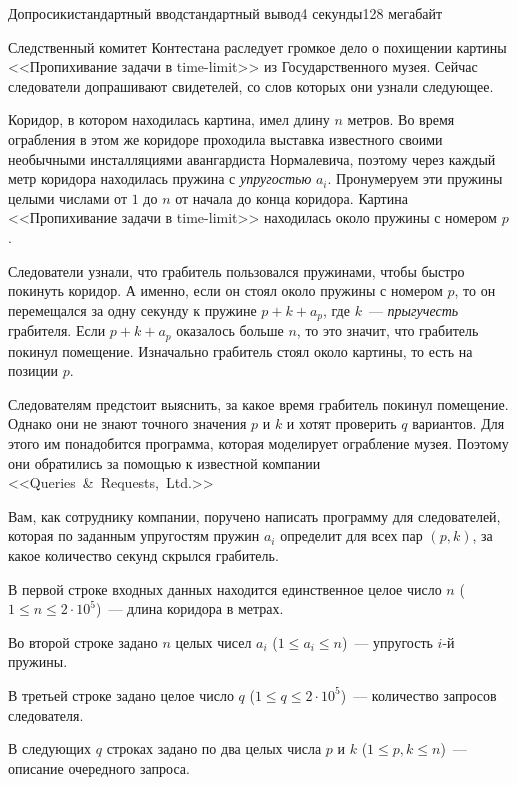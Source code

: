 \begin{problem}{Допросики}{стандартный ввод}{стандартный вывод}{4 секунды}{128 мегабайт}

Следственный комитет Контестана раследует громкое дело о похищении картины <<Пропихивание задачи в time-limit>> из Государственного музея. Сейчас следователи допрашивают свидетелей, со слов которых они узнали следующее.

Коридор, в котором находилась картина, имел длину $n$ метров. Во время ограбления в этом же коридоре проходила выставка известного своими необычными инсталляциями авангардиста Нормалевича, поэтому через каждый метр коридора находилась пружина с \textit{упругостью} $a_i$. Пронумеруем эти пружины целыми числами от $1$ до $n$ от начала до конца коридора. Картина <<Пропихивание задачи в time-limit>> находилась около пружины с номером $p$.

Следователи узнали, что грабитель пользовался пружинами, чтобы быстро покинуть коридор. А именно, если он стоял около пружины с номером $p$, то он перемещался за одну секунду к пружине $p + k + a_p$, где $k$~--- \textit{прыгучесть} грабителя. Если $p + k + a_p$ оказалось больше $n$, то это значит, что грабитель покинул помещение. Изначально грабитель стоял около картины, то есть на позиции $p$.

Следователям предстоит выяснить, за какое время грабитель покинул помещение. Однако они не знают точного значения $p$ и $k$ и хотят проверить $q$ вариантов. Для этого им понадобится программа, которая моделирует ограбление музея. Поэтому они обратились за помощью к известной компании <<Queries~\&~Requests,~Ltd.>>

Вам, как сотруднику компании, поручено написать программу для следователей, которая по заданным упругостям пружин $a_i$ определит для всех пар $(p, k)$, за какое количество секунд скрылся грабитель.

\InputFile

В первой строке входных данных находится единственное целое число $n$ ($1 \le n \le 2\cdot10^5$)~--- длина коридора в метрах.

Во второй строке задано $n$ целых чисел $a_i$ ($1 \le a_i \le n$)~--- упругость $i$-й пружины.

В третьей строке задано целое число $q$ ($1 \le q \le 2\cdot10^5$)~--- количество запросов следователя.

В следующих $q$ строках задано по два целых числа $p$ и $k$ ($1 \le p, k \le n$)~--- описание очередного запроса.


\end{problem}
